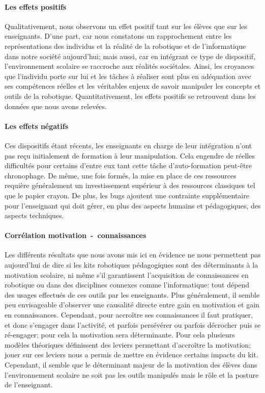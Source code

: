 
\paragraph{Les effets positifs}
    Qualitativement, nous observons un effet positif tant sur les élèves que sur les enseignants. D'une part, car nous constatons un rapprochement entre les représentations des individus et la réalité de la robotique et de l'informatique dans notre société aujourd'hui; mais aussi, car en intégrant ce type de dispositif, l'environnement scolaire se raccroche aux réalités sociétales. Ainsi, les croyances que l'individu porte sur lui et les tâches à réaliser sont plus en adéquation avec ses compétences réelles et les véritables enjeux de savoir manipuler les concepts et outils de la robotique.
    Quantitativement, les effets positifs  se retrouvent dans les données que nous avons relevées.
\paragraph{Les effets négatifs}
    Ces dispositifs étant récents, les enseignants en charge de leur intégration n'ont pas reçu initialement de formation à leur manipulation. Cela engendre de réelles difficultés pour certains d'entre eux tant cette tâche d'auto-formation peut-être chronophage. De même, une fois formés, la mise en place de ces ressources requière généralement un investissement supérieur à des ressources classiques tel que le papier crayon. De plus, les bugs  ajoutent une contrainte supplémentaire pour l'enseignant qui doit gérer, en plus des aspects humains et pédagogiques, des aspects techniques.
\paragraph{Corrélation motivation~-~connaissances}
    Les différents résultats que nous avons mis ici en évidence ne nous permettent pas aujourd'hui de dire si les kits robotiques pédagogiques sont des déterminants à la motivation scolaire, ni même s'il garantissent l'acquisition de connaissances en robotique ou dans des disciplines connexes comme l'informatique: tout dépend des usages effectués de ces outils par les enseignants. Plus généralement, il semble peu envisageable d'observer une causalité directe entre gain en motivation et gain en connaissances. Cependant, pour accroître ses connaissances il faut pratiquer, et donc s'engager dans l'activité, et parfois persévérer ou parfois décrocher puis se ré-engager; pour cela la motivation sera déterminante. Pour cela plusieurs modèles théoriques définissent des leviers permettant d'accroître la motivation; jouer sur ces leviers nous a permis de mettre en évidence certains impacts du kit.
    Cependant, il semble que le déterminant majeur de la motivation des élèves dans l'environnement scolaire ne soit pas les outils manipulés mais le rôle et la posture de l'enseignant.